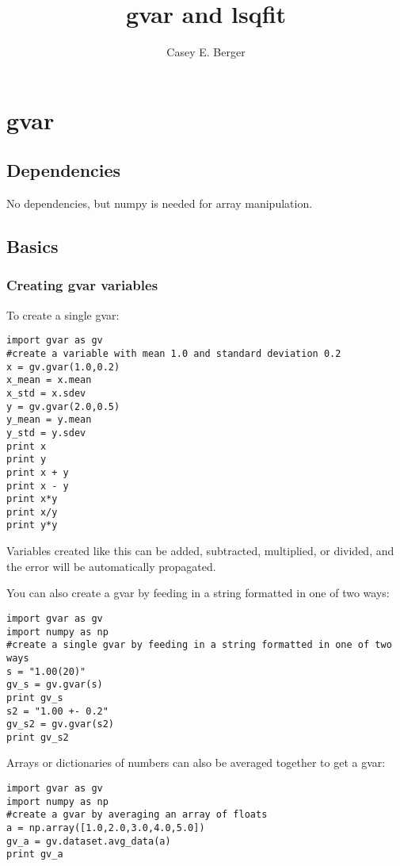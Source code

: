 \documentclass[english,course,headertitle,theoremsection,nocleardoublepage,twoside,onecolumn]{Notes}
\title{gvar and lsqfit}
\author{Casey E. Berger}
\date{\day}{\month}{\year}
\begin{document}
\section{gvar}
\subsection{Dependencies}
No dependencies, but numpy is needed for array manipulation.
\subsection{Basics}
\subsubsection{Creating gvar variables}
To create a single gvar:
\lstset{language=python}
\begin{lstlisting}
import gvar as gv
#create a variable with mean 1.0 and standard deviation 0.2
x = gv.gvar(1.0,0.2)
x_mean = x.mean
x_std = x.sdev
y = gv.gvar(2.0,0.5)
y_mean = y.mean
y_std = y.sdev
print x
print y
print x + y
print x - y
print x*y
print x/y
print y*y
\end{lstlisting}

Variables created like this can be added, subtracted, multiplied, or divided, and the error will be automatically propagated.

You can also create a gvar by feeding in a string formatted in one of two ways:

\begin{lstlisting}
import gvar as gv
import numpy as np
#create a single gvar by feeding in a string formatted in one of two ways
s = "1.00(20)"
gv_s = gv.gvar(s)
print gv_s
s2 = "1.00 +- 0.2"
gv_s2 = gv.gvar(s2)
print gv_s2
\end{lstlisting}

Arrays or dictionaries of numbers can also be averaged together to get a gvar:

\begin{lstlisting}
import gvar as gv
import numpy as np
#create a gvar by averaging an array of floats
a = np.array([1.0,2.0,3.0,4.0,5.0])
gv_a = gv.dataset.avg_data(a)
print gv_a
\end{lstlisting}
\end{document}
